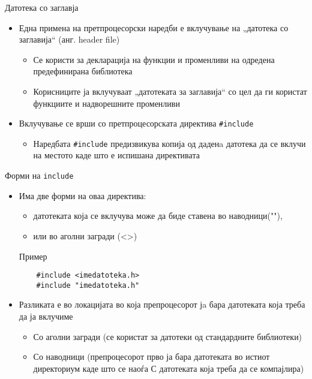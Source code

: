 \begin{frame}{Датотека со заглавја}
\begin{itemize}
    \item Една примена на претпроцесорски наредби е вклучување на „датотека со заглавија“ (анг. header file)
    \begin{itemize}
        \item Се користи за декларација на функции и променливи на одредена предефинирана библиотека
        \item Корисниците ја вклучуваат „датотеката за заглавија“ со цел да ги користат функциите и надворешните променливи
    \end{itemize}
    \item Вклучување се врши со претпроцесорската директива \texttt{\#include}
    \begin{itemize}
        \item Наредбата \texttt{\#include} предизвикува копија од даденa датотека да се вклучи на местото каде што е испишана директивата
    \end{itemize}
\end{itemize}
\end{frame}

\begin{frame}[fragile,shrink=5]{Форми на \texttt{include}}
\begin{itemize}
    \item Има две форми на оваа директива:
    \begin{itemize}
        \item датотеката која се вклучува може да биде ставена во наводници(""), 
        \item или во аголни загради (<>)
    \end{itemize}
    \begin{exampleblock}{Пример}
\begin{verbatim}
    #include <imedatoteka.h>
    #include "imedatoteka.h"
\end{verbatim}
    \end{exampleblock}
    \item Разликата е во локацијата во која препроцесорот јa бара датотеката која треба да ја вклучиме
    \begin{itemize}
        \item Со аголни загради (се користат за датотеки од стандардните библиотеки) 
        \item Со наводници (препроцесорот прво ја бара датотеката во истиот директориум каде што се наоѓа С датотеката која треба да се компајлира)
    \end{itemize}
\end{itemize}

\end{frame}


